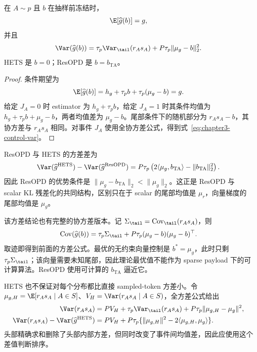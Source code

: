 \begin{theorem}
\label{thm:chapter3-resopd}
在 $A\sim p$ 且 $b$ 在抽样前冻结时，
\[
 \E[\widehat g(b)]=g,
\]
并且
\begin{equation}
 \Var(\widehat g(b))
 =\tau_p\Var_{\tail}(r_As_A)
  +P\tau_p\lVert\mu_g-b\rVert_2^2.
 \label{eq:chapter3-control-var}
\end{equation}
HETS 是 $b=0$；ResOPD 是 $b=b_{\mathrm{TA}}$。
\end{theorem}

\begin{proof}
条件期望为
\[
 \E[\widehat g(b)]
 =h_g+\tau_pb+\tau_p(\mu_g-b)=g.
\]
给定 $J_A=0$ 时 estimator 为 $h_g+\tau_pb$，给定 $J_A=1$ 时其条件均值为 $h_g+\tau_pb+\mu_g-b$，两者均值差为 $\mu_g-b$。尾部条件下的随机部分为 $r_As_A-b$，其协方差与 $r_As_A$ 相同。对事件 $J_A$ 使用全协方差公式，得到式~\eqref{eq:chapter3-control-var}。
\end{proof}

ResOPD 与 HETS 的方差差为
\begin{equation}
 \Var(\widehat g^{\mathrm{HETS}})-\Var(\widehat g^{\mathrm{ResOPD}})
 =P\tau_p\left(2\langle\mu_g,b_{\mathrm{TA}}\rangle-\lVert b_{\mathrm{TA}}\rVert_2^2\right).
 \label{eq:chapter3-hets-resopd-gap}
\end{equation}
因此 ResOPD 的优势条件是
$\lVert\mu_g-b_{\mathrm{TA}}\rVert_2<\lVert\mu_g\rVert_2$。这正是 ResOPD 与 scalar KL 残差化的共同结构，区别只在于 scalar 的尾部均值是 $\mu_r$，向量梯度的尾部均值是 $\mu_g$。

该方差结论也有完整的协方差版本。记 $\Sigma_{\tail}=\operatorname{Cov}_{\tail}(r_As_A)$，则
\[
 \operatorname{Cov}(\widehat g(b))
 =\tau_p\Sigma_{\tail}
  +P\tau_p(\mu_g-b)(\mu_g-b)^\top.
\]
取迹即得到前面的方差公式。最优的无约束向量控制是 $b^*=\mu_g$，此时只剩 $\tau_p\Sigma_{\tail}$；该向量需要未知尾部，因此理论最优值不能作为 sparse payload 下的可计算算法。ResOPD 使用可计算的 $b_{\mathrm{TA}}$ 逼近它。

HETS 也不保证对每个分布都比直接 sampled-token 方差小。令 $\mu_{g,H}=\E[r_As_A\mid A\in S]$、$V_H=\Var(r_As_A\mid A\in S)$，全方差公式给出
\begin{align*}
 \Var(r_As_A)&=PV_H+\tau_p\Var_{\tail}(r_As_A)
 +P\tau_p\lVert\mu_{g,H}-\mu_g\rVert^2,\\
 \Var(r_As_A)-\Var(\widehat g^{\mathrm{HETS}})
 &=PV_H+P\tau_p\{\lVert\mu_{g,H}\rVert^2
 -2\langle\mu_{g,H},\mu_g\rangle\}.
\end{align*}
头部精确求和删除了头部内部方差，但同时改变了事件间均值差，因此应使用这个差值判断排序。


